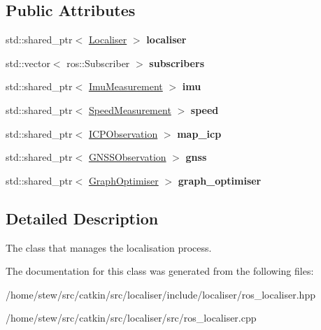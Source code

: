 \subsection*{Public Attributes}
\begin{DoxyCompactItemize}
\item 
\mbox{\label{classROSLocaliser_abe99883c01170dfcc60a88b88328ae32}} 
std\+::shared\+\_\+ptr$<$ \hyperlink{classLocaliser}{Localiser} $>$ {\bfseries localiser}
\item 
\mbox{\label{classROSLocaliser_a44b1094cd2f22b428c749a40ba1448cc}} 
std\+::vector$<$ ros\+::\+Subscriber $>$ {\bfseries subscribers}
\item 
\mbox{\label{classROSLocaliser_a58e3e5be6d6fc11358d603891592c49e}} 
std\+::shared\+\_\+ptr$<$ \hyperlink{classImuMeasurement}{Imu\+Measurement} $>$ {\bfseries imu}
\item 
\mbox{\label{classROSLocaliser_a3fc7a190f5a5d5655a28c2b4b4f1289f}} 
std\+::shared\+\_\+ptr$<$ \hyperlink{classSpeedMeasurement}{Speed\+Measurement} $>$ {\bfseries speed}
\item 
\mbox{\label{classROSLocaliser_ac03dc811fd3ab83a58b1d0b4622aae59}} 
std\+::shared\+\_\+ptr$<$ \hyperlink{classICPObservation}{I\+C\+P\+Observation} $>$ {\bfseries map\+\_\+icp}
\item 
\mbox{\label{classROSLocaliser_a3d8f0d6a48173cbde2bb7197992cf720}} 
std\+::shared\+\_\+ptr$<$ \hyperlink{classGNSSObservation}{G\+N\+S\+S\+Observation} $>$ {\bfseries gnss}
\item 
\mbox{\label{classROSLocaliser_ab4def0822d196c1693033bac76c834b7}} 
std\+::shared\+\_\+ptr$<$ \hyperlink{classGraphOptimiser}{Graph\+Optimiser} $>$ {\bfseries graph\+\_\+optimiser}
\end{DoxyCompactItemize}


\subsection{Detailed Description}
The class that manages the localisation process. 

The documentation for this class was generated from the following files\+:\begin{DoxyCompactItemize}
\item 
/home/stew/src/catkin/src/localiser/include/localiser/ros\+\_\+localiser.\+hpp\item 
/home/stew/src/catkin/src/localiser/src/ros\+\_\+localiser.\+cpp\end{DoxyCompactItemize}
